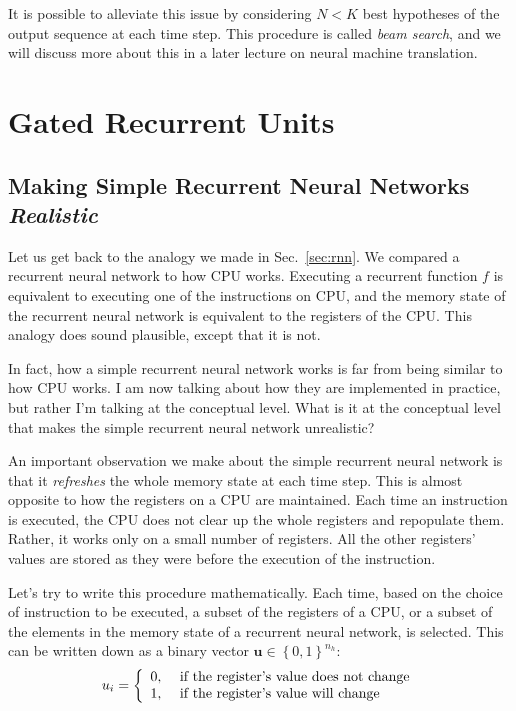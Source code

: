 \documentclass{report}
\newcommand{\vect}[1]{\mathbf{#1}}
\newcommand{\vu}[0]{\vect{u}}
\newcommand{\alert}[1]{\textcolor{red}{#1}}
\begin{document}
It is possible to alleviate this issue by considering $N<K$ best hypotheses of
the output sequence at each time step. This procedure is called {\em beam
search}, and we will discuss more about this in a later lecture on neural
machine translation.

%
%

\section{Gated Recurrent Units}

\subsection{Making Simple Recurrent Neural Networks {\em Realistic}}

Let us get back to the analogy we made in Sec.~\ref{sec:rnn}. We compared a
recurrent neural network to how CPU works. Executing a recurrent function $f$ is
equivalent to executing one of the instructions on CPU, and the memory state of
the recurrent neural network is equivalent to the registers of the CPU. This
analogy does sound plausible, except that it is not.

In fact, how a simple recurrent neural network works is far from being similar
to how CPU works. I am now talking about how they are implemented in practice,
but rather I'm talking at the conceptual level. What is it at the conceptual
level that makes the simple recurrent neural network unrealistic?

An important observation we make about the simple recurrent neural network is
that it {\em refreshes} the whole memory state at each time step. This is almost
opposite to how the registers on a CPU are maintained. Each time an instruction
is executed, the CPU does not clear up the whole registers and repopulate them.
Rather, it works only on a small number of registers. All the other registers'
values are stored as they were before the execution of the instruction.

Let's try to write this procedure mathematically. Each time, based on the choice
of instruction to be executed, a subset of the registers of a CPU, or a subset
of the elements in the memory state of a recurrent neural network, is selected.
This can be written down as a binary vector $\vu \in \left\{ 0, 1\right\}^{n_h}$:
\begin{align*}
    u_i = \left\{ 
        \begin{array}{l l}
            0, & \text{ if the register's value does not change} \\
            1, & \text{ if the register's value will change}
        \end{array}
        \right.
\end{align*}
\end{document}
